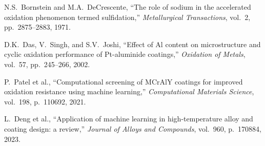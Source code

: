 \documentclass[11pt,letterpaper]{article}
\begin{document}
\begin{enumerate}[nosep,label={[\arabic*]}]
\item N.S.\ Bornstein and M.A.\ DeCrescente, ``The role of sodium in the accelerated oxidation phenomenon termed sulfidation,'' \textit{Metallurgical Transactions}, vol.\ 2, pp.\ 2875--2883, 1971.

\item D.K.\ Das, V.\ Singh, and S.V.\ Joshi, ``Effect of Al content on microstructure and cyclic oxidation performance of Pt-aluminide coatings,'' \textit{Oxidation of Metals}, vol.\ 57, pp.\ 245--266, 2002.

\item P.\ Patel et al., ``Computational screening of MCrAlY coatings for improved oxidation resistance using machine learning,'' \textit{Computational Materials Science}, vol.\ 198, p.\ 110692, 2021.

\item L.\ Deng et al., ``Application of machine learning in high-temperature alloy and coating design: a review,'' \textit{Journal of Alloys and Compounds}, vol.\ 960, p.\ 170884, 2023.

\end{enumerate}
\end{document}
